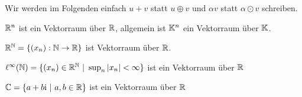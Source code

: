 Wir werden im Folgenden einfach \(u +v\) statt \(u \oplus v\) und \(\alpha v\) statt \(\alpha \odot v\) schreiben.
\label{vektorraeume/vektorraeume:example-1}
\begin{example}{}{}



\(\mathbb{R}^n\) ist ein Vektorraum über \(\mathbb{R}\), allgemein ist \(\mathbb{K}^n\) ein Vektorraum über \(\mathbb{K}\).
\end{example}
\label{vektorraeume/vektorraeume:example-2}
\begin{example}{}{}



\(\mathbb{R}^{\mathbb{N}} =  \{(x_n):\mathbb{N} \rightarrow \mathbb{R}\}\) ist Vektorraum über \(\mathbb{R}\).
\end{example}
\label{vektorraeume/vektorraeume:example-3}
\begin{example}{}{}



\(\ell^\infty(\mathbb{N}) = \{(x_n) \in \mathbb{R}^{\mathbb{N}}~|~\sup_n |x_n| < \infty\}\) ist ein Vektorraum über \(\mathbb{R}\)
\end{example}
\label{vektorraeume/vektorraeume:example-4}
\begin{example}{}{}



\(\mathbb{C} = \{ a + b \mathrm{i} ~|~ a,b \in \mathbb{R}\}\) ist ein Vektorraum über \(\mathbb{R}\)
\end{example}

